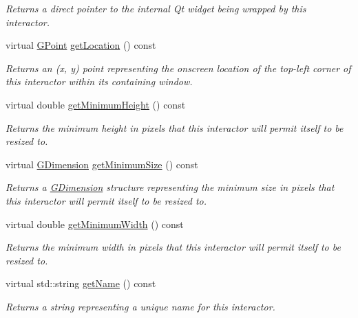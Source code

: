 \begin{DoxyCompactItemize}
\begin{DoxyCompactList}\small\item\em Returns a direct pointer to the internal Qt widget being wrapped by this interactor. \end{DoxyCompactList}\item 
virtual \mbox{\hyperlink{structGPoint}{G\+Point}} \mbox{\hyperlink{classGInteractor_a4f83802015511edeb63b892830812c11}{get\+Location}} () const
\begin{DoxyCompactList}\small\item\em Returns an (x, y) point representing the onscreen location of the top-\/left corner of this interactor within its containing window. \end{DoxyCompactList}\item 
virtual double \mbox{\hyperlink{classGInteractor_aed4b0075fcc434499c3cb3e46896bda3}{get\+Minimum\+Height}} () const
\begin{DoxyCompactList}\small\item\em Returns the minimum height in pixels that this interactor will permit itself to be resized to. \end{DoxyCompactList}\item 
virtual \mbox{\hyperlink{structGDimension}{G\+Dimension}} \mbox{\hyperlink{classGInteractor_a66b5af0b32493b4d597ca0a3df2049ea}{get\+Minimum\+Size}} () const
\begin{DoxyCompactList}\small\item\em Returns a \mbox{\hyperlink{structGDimension}{G\+Dimension}} structure representing the minimum size in pixels that this interactor will permit itself to be resized to. \end{DoxyCompactList}\item 
virtual double \mbox{\hyperlink{classGInteractor_a59e668114fe3d49d2a0f28deb258f7c8}{get\+Minimum\+Width}} () const
\begin{DoxyCompactList}\small\item\em Returns the minimum width in pixels that this interactor will permit itself to be resized to. \end{DoxyCompactList}\item 
virtual std\+::string \mbox{\hyperlink{classGInteractor_a8a60438a5b55d0b2ceb35c8674b9d8c5}{get\+Name}} () const
\begin{DoxyCompactList}\small\item\em Returns a string representing a unique name for this interactor. \end{DoxyCompactList}\item 

\end{DoxyCompactItemize}

